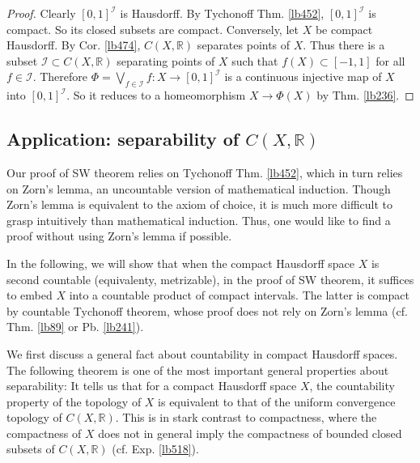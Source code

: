 \documentclass[12pt,b5paper,notitlepage]{article}
\theoremstyle{definition}
\theoremstyle{plain}
\newcommand{\scr}{\mathscr}
\newcommand{\Rbb}{\mathbb R}
\numberwithin{equation}{section}
\begin{document}
\begin{proof}
Clearly $[0,1]^{\scr I}$ is Hausdorff. By Tychonoff Thm. \ref{lb452}, $[0,1]^{\scr I}$ is compact. So its closed subsets are compact. Conversely, let $X$ be compact Hausdorff. By Cor. \ref{lb474}, $C(X,\Rbb)$ separates points of $X$. Thus there is a subset $\scr I\subset C(X,\Rbb)$ separating points of $X$ such that $f(X)\subset[-1,1]$ for all $f\in\scr I$. Therefore $\Phi=\bigvee_{f\in\scr I}f:X\rightarrow[0,1]^{\scr I}$ is a continuous injective map of $X$ into $[0,1]^{\scr I}$. So it reduces to a homeomorphism $X\rightarrow\Phi(X)$ by Thm. \ref{lb236}.
\end{proof}









\subsection{Application: separability of $C(X,\Rbb)$}\label{lb513}


Our proof of SW theorem relies on Tychonoff Thm. \ref{lb452}, which in turn relies on Zorn's lemma, an uncountable version of mathematical induction. Though Zorn's lemma is equivalent to the axiom of choice, it is much more difficult to grasp intuitively than mathematical induction. Thus, one would like to find a proof without using Zorn's lemma if possible. 

In the following, we will show that when the compact Hausdorff space $X$ is second countable (equivalenty, metrizable), in the proof of SW theorem, it suffices to embed $X$ into a countable product of compact intervals. The latter is compact by countable Tychonoff theorem, whose proof does not rely on Zorn's lemma (cf. Thm. \ref{lb89} or Pb. \ref{lb241}). 

We first discuss a general fact about countability in compact Hausdorff spaces. The following theorem is one of the most important general properties about separability: It tells us that for a compact Hausdorff space $X$, the countability property of the topology of $X$ is equivalent to that of the uniform convergence topology of $C(X,\Rbb)$. %
This is in stark contrast to compactness, where the compactness of $X$ does not in general imply the compactness of bounded closed subsets of  $C(X,\Rbb)$  (cf. Exp. \ref{lb518}).
\end{document}
